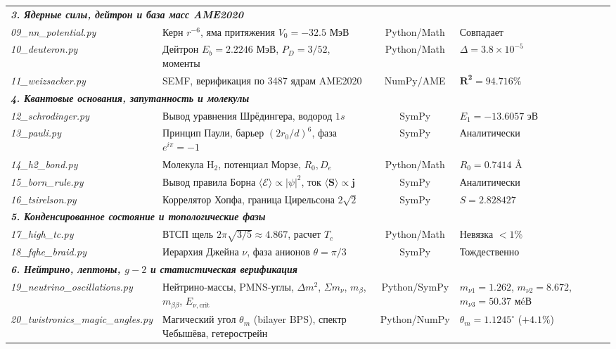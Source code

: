 \documentclass[11pt,a4paper]{article}
\theoremstyle{definition}
\theoremstyle{remark}
\begin{document}
\begin{table}[H]
\begin{tabularx}{\textwidth}{l p{5.5cm} c >{\raggedleft\arraybackslash}X}
\midrule
\multicolumn{4}{l}{\textit{\textbf{3. Ядерные силы, дейтрон и база масс AME2020}}} \\
\textit{09\_nn\_potential.py} & Керн $r^{-6}$, яма притяжения $V_0 = -32.5$ МэВ & Python/Math & Совпадает \\
\textit{10\_deuteron.py} & Дейтрон $E_b = 2.2246$ МэВ, $P_D = 3/52$, моменты & Python/Math & $\Delta = 3.8 \times 10^{-5}$ \\
\textit{11\_weizsacker.py} & SEMF, верификация по 3487 ядрам AME2020 & NumPy/AME & $\mathbf{R^2 = 94.716\%}$ \\
\midrule
\multicolumn{4}{l}{\textit{\textbf{4. Квантовые основания, запутанность и молекулы}}} \\
\textit{12\_schrodinger.py} & Вывод уравнения Шрёдингера, водород $1s$ & SymPy & $E_1 = -13.6057\text{ эВ}$ \\
\textit{13\_pauli.py} & Принцип Паули, барьер $(2r_0/d)^6$, фаза $e^{i\pi}=-1$ & SymPy & Аналитически \\
\textit{14\_h2\_bond.py} & Молекула $\mathrm{H}_2$, потенциал Морзе, $R_0, D_e$ & Python/Math & $R_0 = 0.7414\text{ \AA}$ \\
\textit{15\_born\_rule.py} & Вывод правила Борна $\langle\mathcal{E}\rangle \propto |\psi|^2$, ток $\langle\mathbf{S}\rangle \propto \mathbf{j}$ & SymPy & Аналитически \\
\textit{16\_tsirelson.py} & Коррелятор Хопфа, граница Цирельсона $2\sqrt{2}$ & SymPy & $S = 2.828427$ \\
\midrule
\multicolumn{4}{l}{\textit{\textbf{5. Конденсированное состояние и топологические фазы}}} \\
\textit{17\_high\_tc.py} & ВТСП щель $2\pi\sqrt{3/5} \approx 4.867$, расчет $T_c$ & Python/Math & Невязка $< 1\%$ \\
\textit{18\_fqhe\_braid.py} & Иерархия Джейна $\nu$, фаза анионов $\theta = \pi/3$ & SymPy & Тождественно \\
\midrule
\multicolumn{4}{l}{\textit{\textbf{6. Нейтрино, лептоны, $g-2$ и статистическая верификация}}} \\
\textit{19\_neutrino\_oscillations.py} & Нейтрино-массы, PMNS-углы, $\Delta m^2$, $\Sigma m_\nu$, $m_\beta$, $m_{\beta\beta}$, $E_{\nu,\mathrm{crit}}$ & Python/SymPy & $m_{\nu1}=1.262$, $m_{\nu2}=8.672$, $m_{\nu3}=50.37$ мéВ \\
\textit{20\_twistronics\_magic\_angles.py} & Магический угол $\theta_m$ (bilayer BPS), спектр Чебышёва, гетерострейн & Python/NumPy & $\theta_m=1.1245^\circ$ ($+4.1\%$) \\

\end{tabularx}
\end{table}
\end{document}
